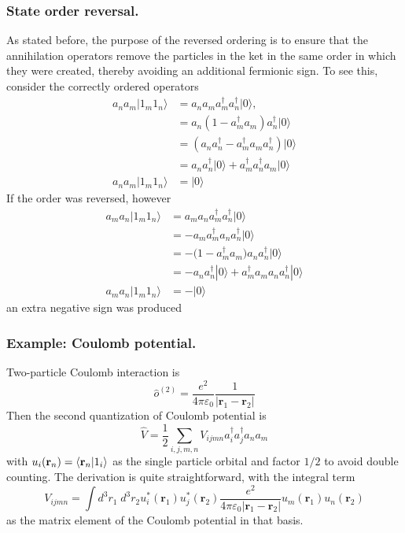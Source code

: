 \documentclass[../../../main.tex]{subfiles}
\begin{document}
\subsubsection{State order reversal.}
As stated before, the purpose of the reversed ordering is to ensure that the annihilation operators remove the particles in the ket in the same order in which they were created, thereby avoiding an additional fermionic sign.
To see this, consider the correctly ordered operators
\begin{align*}
  a_n a_m \lvert 1_m 1_n\rangle
   & = a_n a_m a_m^\dagger a_n^\dagger \lvert 0\rangle,                                  \\
   & =  a_n(1 - a_m^\dagger a_m) a_n^\dagger \lvert 0\rangle                             \\
   & =  (a_n a_n^\dagger -  a_m^\dagger a_m a_n^\dagger )  \lvert 0\rangle               \\
   & =  a_n a_n^\dagger   \lvert 0\rangle + a_m^\dagger a_n^\dagger a_m  \lvert 0\rangle \\
  a_n a_m \lvert 1_m 1_n\rangle
   & = \lvert 0\rangle
\end{align*}
If the order was reversed, however
\begin{align*}
  a_m a_n|1_m1_n\rangle
                        & = a_m a_n a_m^\dagger a_n^\dagger |0\rangle                             \\
                        & = -a_m a_m^\dagger a_n a_n^\dagger|0\rangle                             \\
                        & = -\big(1-a_m^\dagger a_m\big)a_n a_n^\dagger|0\rangle                  \\
                        & = - a_n a_n^\dagger|0\rangle + a_m^\dagger a_m a_n a_n^\dagger|0\rangle \\
  a_m a_n|1_m1_n\rangle & = -|0\rangle
\end{align*}
an extra negative sign was produced

\subsubsection{Example: Coulomb potential.}
Two-particle Coulomb interaction is
\begin{equation*}
  \hat{o}^{(2)}
  = \frac{e^2}{4\pi\varepsilon_0}\frac{1}{|{\mathbf r}_1-{\mathbf r}_2|}
\end{equation*}
Then the second quantization of Coulomb potential is
\begin{equation*}
  \hat{V}
  = \frac{1}{2}\sum_{i,j,m,n}V_{ijmn} a_i^\dagger a_j^\dagger a_n a_m
\end{equation*}
with $u_i(\mathbf{r}_n) = \braket{\mathbf{r}_n  | 1_i}$ as the single particle orbital and factor $1/2$ to avoid double counting.
The derivation is quite straightforward, with the integral term
\begin{equation*}
  V_{ijmn}
  = \int d^3r_1\;d^3r_2 u_i^*({\mathbf r}_1)u_j^*({\mathbf r}_2)\frac{e^2}{4\pi\varepsilon_0|{\mathbf r}_1-{\mathbf r}_2|}u_m({\mathbf r}_1)u_n({\mathbf r}_2)
\end{equation*}
as the matrix element of the Coulomb potential in that basis.
\end{document}
